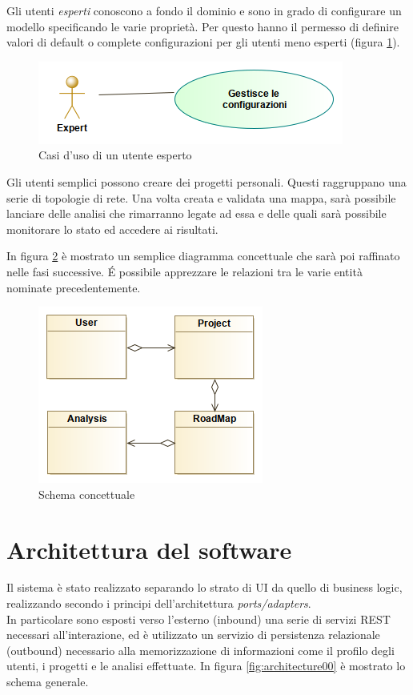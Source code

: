 Gli utenti \textit{esperti} conoscono a fondo il dominio e sono in grado di configurare un modello specificando le varie proprietà.
Per questo hanno il permesso di definire valori di default o complete configurazioni per gli utenti meno esperti (figura \ref{fig:uc-experts}).

\begin{figure}[h]
	\centering
	\includegraphics[scale=0.5]{img/ExpertUC}
	\caption{Casi d'uso di un utente esperto}
	\label{fig:uc-experts}
\end{figure}

Gli utenti semplici possono creare dei progetti personali.
Questi raggruppano una serie di topologie di rete.
Una volta creata e validata una mappa, sarà possibile lanciare delle analisi che rimarranno legate ad essa e delle quali sarà possibile monitorare lo stato ed accedere ai risultati.

In figura \ref{fig:cd-conceptual} è mostrato un semplice diagramma concettuale che sarà poi raffinato nelle fasi successive.
\'E possibile apprezzare le relazioni tra le varie entità nominate precedentemente.

\begin{figure}[h]
	\centering
	\includegraphics[scale=0.5]{img/conceptual00}
	\caption{Schema concettuale}
	\label{fig:cd-conceptual}
\end{figure}

\section{Architettura del software}
Il sistema è stato realizzato separando lo strato di UI da quello di business logic, realizzando secondo i principi dell'architettura \textit{ports/adapters}.\\
In particolare sono esposti verso l'esterno (inbound) una serie di servizi REST necessari all'interazione, ed è utilizzato un servizio di persistenza relazionale (outbound) necessario alla memorizzazione di informazioni come il profilo degli utenti, i progetti e le analisi effettuate.
In figura \ref{fig:architecture00} è mostrato lo schema generale.

